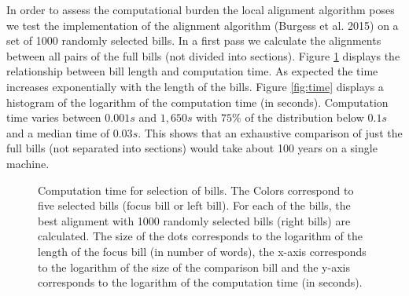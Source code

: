 \documentclass[12pt]{article} %
\begin{document}
In order to assess the computational burden the local alignment algorithm poses we test the implementation of the alignment algorithm (Burgess et al. 2015) on a set of 1000 randomly selected bills. In a first pass we calculate the alignments  between all pairs of the full bills (not divided into sections). Figure \ref{fig:time_size} displays the relationship between bill length and computation time. As expected the time increases exponentially with the length of the bills. Figure \ref{fig:time} displays a histogram of the logarithm of the computation time (in seconds). Computation time varies between $0.001s$ and $1,650s$ with $75\%$ of the distribution below $0.1s$ and a median time of $0.03s$.  This shows that an exhaustive comparison of just the full bills (not separated into sections) would take about 100 years on a single machine.

\begin{figure}[ht!]
\caption{Computation time for selection of bills. The Colors correspond to five selected bills (focus bill or left bill). For each of the bills, the best alignment with 1000 randomly selected bills (right bills) are calculated. The size of the dots corresponds to the logarithm of the length of the focus bill (in number of words), the x-axis corresponds to the logarithm of the size of the comparison bill and the y-axis corresponds to the logarithm of the computation time (in seconds).}
\label{fig:time_size}
\end{figure}
\end{document}
